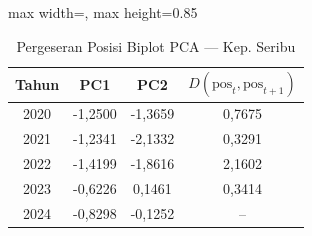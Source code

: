 \begin{table}[H]
\centering
\caption{Pergeseran Posisi Biplot PCA --- Kep. Seribu} \label{tab:appjarak_pca_skor_kep_seribu}
\begin{adjustbox}{max width=\textwidth, max height=0.85\textheight}
\begin{tabular}{|c|c|c|c|}
\hline
\textbf{Tahun} & \textbf{PC1} & \textbf{PC2} & \textbf{$D(\text{pos}_t, \text{pos}_{t+1})$} \\
\hline
2020 & -1,2500 & -1,3659 & 0,7675 \\
2021 & -1,2341 & -2,1332 & 0,3291 \\
2022 & -1,4199 & -1,8616 & 2,1602 \\
2023 & -0,6226 & 0,1461 & 0,3414 \\
2024 & -0,8298 & -0,1252 & -- \\
\hline
\end{tabular}
\end{adjustbox}
\end{table}